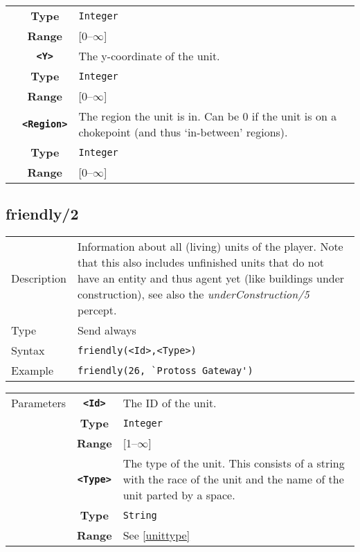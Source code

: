 \begin{tabularx}{\textwidth}{l | c | p{8cm}|}
            & \textbf{Type} & \verb|Integer| \\
            & \textbf{Range} & [0--$\infty$] \\
            \cline{2-3}
            & \textbf{\verb|<Y>|} & The y-coordinate of the unit.\\
            & \textbf{Type} & \verb|Integer| \\
            & \textbf{Range} & [0--$\infty$] \\
            \cline{2-3}
            & \textbf{\verb|<Region>|} & The region the unit is in. Can be 0 if the unit is on a chokepoint (and thus `in-between' regions).\\
            & \textbf{Type} & \verb|Integer| \\
            & \textbf{Range} & [0--$\infty$] \\
            \cline{2-3}
\end{tabularx}

\subsection{friendly/2}
\begin{tabularx}{\textwidth}{lX}
 Description & Information about all (living) units of the player. Note that this also includes unfinished units that do not have an entity and thus agent yet (like buildings under construction), see also the \textit{underConstruction/5} percept. \\
 Type & Send always \\
 Syntax & \verb|friendly(<Id>,<Type>)| \\
 Example & \verb|friendly(26, `Protoss Gateway')| \\
 \end{tabularx}
 \begin{tabularx}{\textwidth}{l | c | p{8cm}|}
 \cline{2-3}
 Parameters
            & \textbf{\verb|<Id>|} & The ID of the unit.\\
            & \textbf{Type} & \verb|Integer| \\
            & \textbf{Range} & [1--$\infty$] \\
            \cline{2-3}
            & \textbf{\verb|<Type>|} & The type of the unit. This consists of a string with the race of the unit and the name of the unit parted by a space. \\
            & \textbf{Type} & \verb|String| \\
            & \textbf{Range} & See \ref{unittype} \\
            \cline{2-3}
\end{tabularx}

